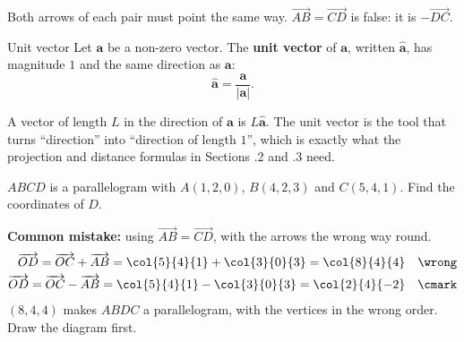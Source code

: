 \begin{center}
\end{center}
Both arrows of each pair must point the same way. $\overrightarrow{AB} = \overrightarrow{CD}$ is false: it is $-\overrightarrow{DC}$.

\begin{definition}{Unit vector}
Let $\mathbf{a}$ be a non-zero vector. The \textbf{unit vector} of $\mathbf{a}$, written $\hat{\mathbf{a}}$, has magnitude $1$ and the same direction as $\mathbf{a}$:
\[
\hat{\mathbf{a}} = \dfrac{\mathbf{a}}{|\mathbf{a}|}.
\]
\end{definition}
A vector of length $L$ in the direction of $\mathbf{a}$ is $L\hat{\mathbf{a}}$. The unit vector is the tool that turns ``direction'' into ``direction of length $1$'', which is exactly what the projection and distance formulas in Sections \chapnum.2 and \chapnum.3 need.

\begin{example}[label=ex:1.5]
$ABCD$ is a parallelogram with $A(1,2,0)$, $B(4,2,3)$ and $C(5,4,1)$. Find the coordinates of $D$.
\end{example}

\begin{mistake}
\textbf{Common mistake:} using $\overrightarrow{AB} = \overrightarrow{CD}$, with the arrows the wrong way round.
\begin{align*}
\overrightarrow{OD} = \overrightarrow{OC} + \overrightarrow{AB} = \col{5}{4}{1} + \col{3}{0}{3} = \col{8}{4}{4} & & \wrong \\
\overrightarrow{OD} = \overrightarrow{OC} - \overrightarrow{AB} = \col{5}{4}{1} - \col{3}{0}{3} = \col{2}{4}{-2} & & \cmark
\end{align*}
$(8,4,4)$ makes $ABDC$ a parallelogram, with the vertices in the wrong order. Draw the diagram first.
\end{mistake}

